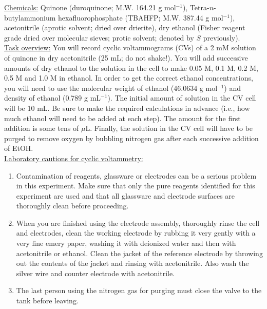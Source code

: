 \documentclass[byrevtex,amssymb,aps,pra,floatfix,letterpaper]{revtex4}
\begin{document}
\noindent
\underline{Chemicals:} Quinone (duroquinone; M.W. 164.21 g mol$^{-1}$), Tetra-$n$-butylammonium hexafluorophosphate (TBAHFP; M.W. 387.44 g mol$^{-1}$), acetonitrile (aprotic solvent; dried over drierite), dry ethanol (Fisher reagent grade dried over molecular sieves; protic solvent; denoted by $S$ previously).\\

\noindent
\underline{Task overview:} You will record cyclic voltammograms (CVs) of a 2 mM solution of quinone in dry acetonitrile (25 mL; do not shake!). You will add successive amounts of dry ethanol to the solution in the cell to make 0.05 M, 0.1 M, 0.2 M, 0.5 M and 1.0 M in ethanol. In order to get the correct ethanol concentrations, you will need to use the molecular weight of ethanol (46.0634 g mol$^{-1}$) and density of ethanol (0.789 g mL$^{-1}$). The initial amount of solution in the CV cell will be 10 mL. Be sure to make the required calculations in advance (i.e., how much ethanol will need to be added at each step). The
amount for the first addition is some tens of $\mu$L. Finally, the solution in the CV cell will have to be purged to remove oxygen by bubbling nitrogen gas after each successive addition of EtOH.\\

\noindent
\underline{Laboratory cautions for cyclic voltammetry:}\\

\noindent
\begin{enumerate}
\item Contamination of reagents, glassware or electrodes can be a serious problem in this experiment. Make sure that only the pure reagents identified for this experiment are used and that all glassware and electrode surfaces are thoroughly clean before proceeding.

\item When you are finished using the electrode assembly, thoroughly rinse the cell and electrodes, clean the working electrode by rubbing it very gently with a very fine emery paper, washing it with deionized water and then with acetonitrile or ethanol. Clean the jacket of the reference electrode by throwing out the contents of the jacket and rinsing with acetonitrile. Also wash the silver wire and counter electrode with acetonitrile.

\item The last person using the nitrogen gas for purging must close the valve to the tank before leaving.

\end{enumerate}
\end{document}
